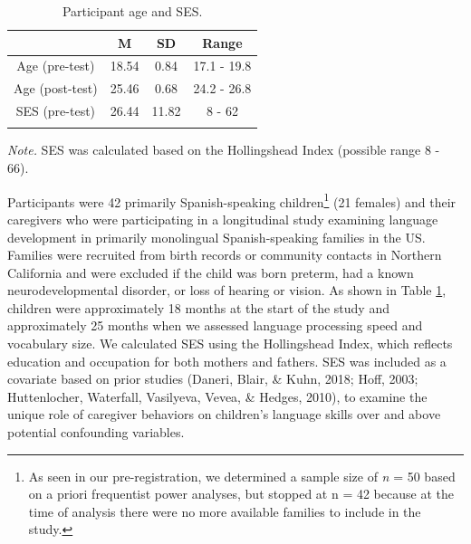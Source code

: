 \documentclass[
  english,
  man,floatsintext]{apa6}
\begin{document}
\begin{table}[tbp]

\begin{center}
\begin{threeparttable}

\caption{\label{tab:tab0}Participant age and SES.}

\begin{tabular}{cccc}
\toprule
  & \multicolumn{1}{c}{M} & \multicolumn{1}{c}{SD} & \multicolumn{1}{c}{Range}\\
\midrule
Age (pre-test) & 18.54 & 0.84 & 17.1 - 19.8\\
Age (post-test) & 25.46 & 0.68 & 24.2 - 26.8\\
SES (pre-test) & 26.44 & 11.82 & 8 - 62\\
\bottomrule
\addlinespace
\end{tabular}

\begin{tablenotes}[para]
\normalsize{\textit{Note.} SES was calculated based on the Hollingshead Index (possible range 8 - 66).}
\end{tablenotes}

\end{threeparttable}
\end{center}

\end{table}

Participants were 42 primarily Spanish-speaking children\footnote{As seen in our pre-registration, we determined a sample size of \emph{n} = 50 based on a priori frequentist power analyses, but stopped at n = 42 because at the time of analysis there were no more available families to include in the study.} (21 females) and their caregivers who were participating in a longitudinal study examining language development in primarily monolingual Spanish-speaking families in the US. Families were recruited from birth records or community contacts in Northern California and were excluded if the child was born preterm, had a known neurodevelopmental disorder, or loss of hearing or vision. As shown in Table \ref{tab:tab0}, children were approximately 18 months at the start of the study and approximately 25 months when we assessed language processing speed and vocabulary size. We calculated SES using the Hollingshead Index, which reflects education and occupation for both mothers and fathers. SES was included as a covariate based on prior studies (Daneri, Blair, \& Kuhn, 2018; Hoff, 2003; Huttenlocher, Waterfall, Vasilyeva, Vevea, \& Hedges, 2010), to examine the unique role of caregiver behaviors on children's language skills over and above potential confounding variables.
\end{document}
